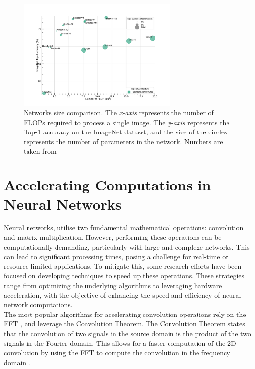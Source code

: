 \begin{figure}[htbp]
    \centering
    \includegraphics[width=0.7\textwidth]{chapter_sota/assets/network_sizes_normal.pdf}
    \caption{Networks size comparison. The \emph{x-axis} represents the number
    of \acp{FLOP} required to process a single image. The \emph{y-axis}
    represents the Top-1 accuracy on the ImageNet \cite{deng2009imagenet}
    dataset, and the size of the circles represents the number of parameters in
    the network. Numbers are taken from \cite{pytorch_vision}}
    \label{fig:sota:net_sizes}
\end{figure}

\section{Accelerating Computations in Neural Networks}\label{sec:sota:fast_convolutions}


Neural networks, utilise two fundamental mathematical operations: convolution
and matrix multiplication. However, performing these operations can be
computationally demanding, particularly with large and complexe networks. This
can lead to significant processing times, posing a challenge for real-time or
resource-limited applications. To mitigate this, some research efforts have been
focused on developing techniques to speed up these operations. These strategies
range from optimizing the underlying algorithms to leveraging hardware
acceleration, with the objective of enhancing the speed and efficiency of neural
network computations.\\


The most popular algorithms for accelerating convolution operations rely on the
\ac{FFT}
\cite{DBLP:conf/nips/ChiJM20,DBLP:journals/npl/LinY19,DBLP:conf/pkdd/PrattWCZ17},
and leverage the Convolution Theorem. The Convolution Theorem states that the
convolution of two signals in the source domain is the product of the two
signals in the Fourier domain. This allows for a faster computation of the 2D
convolution by using the \ac{FFT} to compute the convolution in the frequency
domain \cite{oppenheim1997signals}.\\


